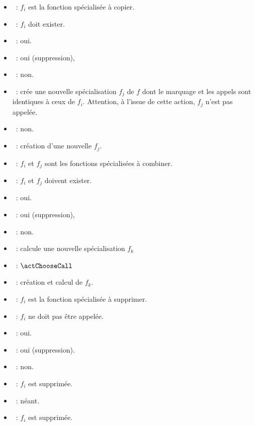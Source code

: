 
\begin{itemize}
  \item \param~: $f_i$ est la fonction spécialisée à copier.
  \item \precond~: $f_i$ doit exister.
  \item \creable~: oui.
  \item \modifiable~: oui (suppression),
  \item \generable~: non.
  \item \application~: 
    crée une nouvelle spécialisation $f_j$ de $f$ dont le marquage et les appels
    sont identiques à ceux de $f_i$.  Attention, à l'issue de cette action,
    $f_j$ n'est pas appelée.
  \item \genere~: non.
  \item \modifie~: création d'une nouvelle $f_j$.
\end{itemize}


\begin{itemize}
  \item \param~: $f_i$ et $f_j$ sont les fonctions spécialisées à combiner.
  \item \precond~: $f_i$ et $f_j$ doivent exister.
  \item \creable~: oui.
  \item \modifiable~: oui (suppression),
  \item \generable~: non.
  \item \application~: calcule une nouvelle spécialisation $f_k$
  \item \genere~: $\actChooseCall$
  \item \modifie~: création et calcul de $f_k$.
\end{itemize}


\begin{itemize}
  \item \param~: $f_i$ est la fonction spécialisée à supprimer.
  \item \precond~: $f_i$ ne doit pas être appelée.
  \item \creable~: oui.
  \item \modifiable~: oui (suppression).
  \item \generable~: non.
  \item \application~: $f_i$ est supprimée.
  \item \genere~: néant.
  \item \modifie~: $f_i$ est supprimée.
\end{itemize}
